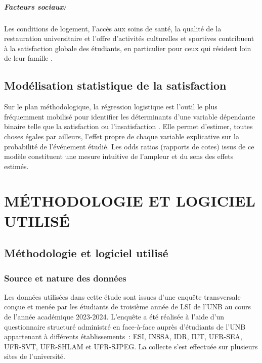 \documentclass[
12pt,          %
a4paper,       %
oneside,      %
openright      %
]{report}          %
\begin{document}
		\paragraph{Facteurs sociaux:} Les conditions de logement, l'accès aux soins de santé,
		la qualité de la restauration universitaire et l'offre d'activités culturelles et sportives
		contribuent à la satisfaction globale des étudiants, en particulier pour ceux qui résident
		loin de leur famille
		\citep{amole2009}.
		
		
		\section{Modélisation statistique de la satisfaction}
		Sur le plan méthodologique, la régression logistique est l'outil le plus fréquemment
		mobilisé pour identifier les déterminants d'une variable dépendante binaire telle que
		la satisfaction ou l'insatisfaction 
		\citep{hosmer2013applied}. 
		Elle permet d'estimer,
		toutes choses égales par ailleurs, l'effet propre de chaque variable explicative sur
		la probabilité de l'événement étudié. Les odds ratios (rapports de cotes) issus de
		ce modèle constituent une mesure intuitive de l'ampleur et du sens des effets estimés.
		
		
		
		\chapter{MÉTHODOLOGIE ET LOGICIEL UTILISÉ}
		\section{Méthodologie et logiciel utilisé}
		
		\subsection{Source et nature des données}
		
		Les données utilisées dans cette étude sont issues d'une enquête transversale conçue et
		menée par les étudiants de troisième année de LSI de l'UNB au cours de l'année académique
		2023-2024. L'enquête a été réalisée à l'aide d'un questionnaire structuré administré en
		face-à-face auprès d'étudiants de l'UNB appartenant à différents établissements~: ESI,
		INSSA, IDR, IUT, UFR-SEA, UFR-SVT, UFR-SHLAM et UFR-SJPEG. La collecte s'est effectuée
		sur plusieurs sites de l'université.
		
\end{document}
